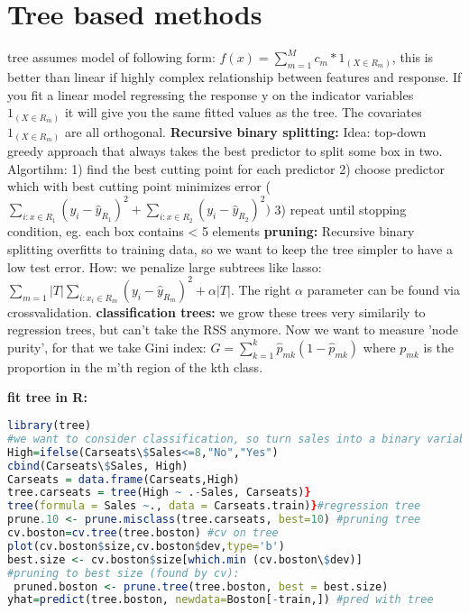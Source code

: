 \section{Tree based methods}
tree assumes model of following form: 
$f(x) = \sum_{m=1}^M c_m*1_{(X \in R_m)}$, this is better than linear if highly complex relationship between features and response. If you fit a linear model regressing the response y on the indicator variables $1_{(X \in R_m)}$ it will give you the same fitted values as the tree. The covariates $1_{(X \in R_m)}$ are all orthogonal.
\textbf{Recursive binary splitting: }
Idea: top-down greedy approach that always takes the best predictor to split some box in two. Algortihm:
1) find the best cutting point for each predictor
2) choose predictor which with best cutting point minimizes error ($\sum_{i:x \in R_1}(y_i-\hat y_{R_1})^2+\sum_{i:x \in R_2}(y_i-\hat y_{R_2})^2)$
3) repeat until stopping condition, eg. each box contains < 5 elements
\textbf{pruning: } Recursive binary splitting overfitts to training data, so we want to keep the tree simpler to have a low test error. How: we penalize large subtrees like lasso: $\sum_{m=1}{|T|}\sum_{i: x_i \in R_m}(y_i - \hat y_{R_m})^2 + \alpha|T|$. The right $\alpha$ parameter can be found via crossvalidation. 
\textbf{classification trees: } we grow these trees very similarily to regression trees, but can't take the RSS anymore. Now we want to measure 'node purity', for that we take Gini index: $G = \sum_{k=1}^k \hat p_{mk}(1-\hat p_{mk})$ where $p_{mk}$ is the proportion in the m'th region of the kth class.

\textbf{fit tree in R:}\begin{lstlisting}[language=R] library(tree)
#we want to consider classification, so turn sales into a binary variable
High=ifelse(Carseats\$Sales<=8,"No","Yes")
cbind(Carseats\$Sales, High)
Carseats = data.frame(Carseats,High)
tree.carseats = tree(High ~ .-Sales, Carseats)}
tree(formula = Sales ~., data = Carseats.train)}#regression tree
prune.10 <- prune.misclass(tree.carseats, best=10) #pruning tree
cv.boston=cv.tree(tree.boston) #cv on tree
plot(cv.boston$size,cv.boston$dev,type='b')
best.size <- cv.boston$size[which.min (cv.boston\$dev)]
#pruning to best size (found by cv): 
 pruned.boston <- prune.tree(tree.boston, best = best.size)
yhat=predict(tree.boston, newdata=Boston[-train,]) #pred with tree \end{lstlisting}